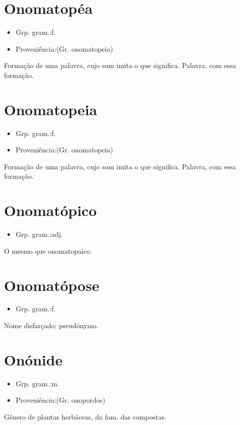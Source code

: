 \section{Onomatopéa}
\begin{itemize}
\item {Grp. gram.:f.}
\end{itemize}
\begin{itemize}
\item {Proveniência:(Gr. \textunderscore onomatopeia\textunderscore )}
\end{itemize}
Formação de uma palavra, cujo som imita o que significa.
Palavra, com essa formação.
\section{Onomatopeia}
\begin{itemize}
\item {Grp. gram.:f.}
\end{itemize}
\begin{itemize}
\item {Proveniência:(Gr. \textunderscore onomatopeia\textunderscore )}
\end{itemize}
Formação de uma palavra, cujo som imita o que significa.
Palavra, com essa formação.
\section{Onomatópico}
\begin{itemize}
\item {Grp. gram.:adj.}
\end{itemize}
O mesmo que \textunderscore onomatopaico\textunderscore .
\section{Onomatópose}
\begin{itemize}
\item {Grp. gram.:f.}
\end{itemize}
Nome disfarçado; pseudónymo.
\section{Onónide}
\begin{itemize}
\item {Grp. gram.:m.}
\end{itemize}
\begin{itemize}
\item {Proveniência:(Gr. \textunderscore onopordos\textunderscore )}
\end{itemize}
Gênero de plantas herbáceas, da fam. das compostas.
